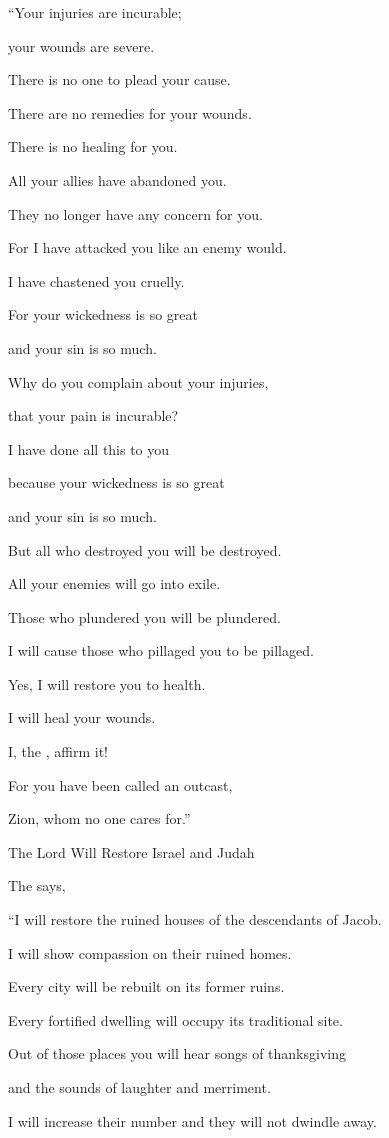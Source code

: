 {\par }{\Q “Your injuries
are incurable;
\par }{\Q your wounds
are severe.
\par }{\Q {}There is no
one to plead
your cause.
\par }{\Q There are no remedies
for your wounds.
\par }{\Q There is no
healing for you.
\par }{\Q {}All
your allies
have abandoned
you.

\par }{\Q They no longer
have any concern
for you.
\par }{\Q For
I have attacked
you like an enemy
would.
\par }{\Q I have chastened
you cruelly.
\par }{\Q For
your wickedness
is so great
\par }{\Q and your sin
is so much.
\par }{\Q {}Why
do you complain
about your injuries,
\par }{\Q that your pain
is incurable?
\par }{\Q I have done
all this
to
you
\par }{\Q because your wickedness
is so great
\par }{\Q and your sin
is so much.
\par }{\Q {}But all
who destroyed
you will be destroyed.
\par }{\Q All
your enemies
will go
into exile.
\par }{\Q Those who plundered
you will be
plundered.
\par }{\Q I will cause those who pillaged
you to be pillaged.
\par }{\Q {}Yes,
I will restore you to health.
\par }{\Q I will heal
your wounds.
\par }{\Q I, the
{}, affirm
it!

\par }{\Q For
you have been
called
an outcast,
\par }{\Q Zion,
whom no
one cares for.”
\par }{\SH The Lord Will Restore Israel and Judah
\par }{\PP {}The
{}
says,
\par }{\Q “I will restore
the ruined houses
of the descendants
of Jacob.
\par }{\Q I will show compassion
on their ruined homes.
\par }{\Q Every city
will be rebuilt
on
its former ruins.
\par }{\Q Every fortified dwelling
will occupy
its traditional site.
\par }{\Q {}Out
of those
places you will hear
songs of thanksgiving
\par }{\Q and the sounds
of laughter and merriment.
\par }{\Q I
will increase
their number and they will not
dwindle
away.

}
